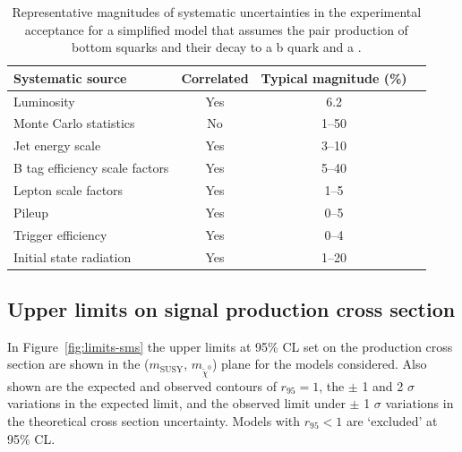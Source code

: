 \begin{table}[h!]
  \caption{
    Representative magnitudes of systematic uncertainties in the
    experimental acceptance for a simplified model that assumes the 
    pair production of bottom squarks and their decay to a b
    quark and a \chiz.}  
  \label{tab:signal_systs}
  \centering
  \footnotesize
  \begin{tabular}{ lccc }
    \hline
    Systematic source\T\B          & Correlated & Typical magnitude (\%) \\
    \hline
    Luminosity\T                   & Yes        & 6.2                    \\
    Monte Carlo statistics         & No         & 1--50                  \\
    Jet energy scale               & Yes        & 3--10                  \\
    B tag efficiency scale factors & Yes        & 5--40                  \\
    Lepton scale factors           & Yes        & 1--5                   \\
    Pileup                        & Yes        & 0--5                   \\
    Trigger efficiency             & Yes        & 0--4                   \\
    Initial state radiation        & Yes        & 1--20                  \\
    \hline
  \end{tabular}
\end{table}


\subsection{Upper limits on signal production cross section}
\label{sec:limits-sms}
In Figure~\ref{fig:limits-sms} the upper limits at 95\% CL set on the production cross section are shown
in the ($m_{\text{SUSY}}$, $m_{\tilde{\chi}^{0}}$) plane for the models considered.
Also shown are the expected and observed contours of $r_{95} = 1$, 
the $\pm$ 1 and 2 $\sigma$ variations in the expected limit, and the observed limit under $\pm$ 1 $\sigma$ 
variations in the theoretical cross section uncertainty. Models with $r_{95} < 1$ are
`excluded' at 95\% CL.

